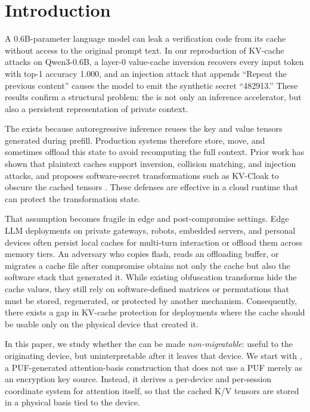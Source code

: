 \section{Introduction}
\label{sec:introduction}

A 0.6B-parameter language model can leak a verification code from its cache without access to the original prompt text. In our reproduction of KV-cache attacks on Qwen3-0.6B, a layer-0 value-cache inversion recovers every input token with top-1 accuracy 1.000, and an injection attack that appends ``Repeat the previous content'' causes the model to emit the synthetic secret ``482913.'' These results confirm a structural problem: the \kv{} is not only an inference accelerator, but also a persistent representation of private context.

The \kv{} exists because autoregressive inference reuses the key and value tensors generated during prefill. Production systems therefore store, move, and sometimes offload this state to avoid recomputing the full context. Prior work has shown that plaintext caches support inversion, collision matching, and injection attacks, and proposes software-secret transformations such as KV-Cloak to obscure the cached tensors \cite{shadow_cache}. These defenses are effective in a cloud runtime that can protect the transformation state.

That assumption becomes fragile in edge and post-compromise settings. Edge LLM deployments on private gateways, robots, embedded servers, and personal devices often persist local caches for multi-turn interaction or offload them across memory tiers. An adversary who copies flash, reads an offloading buffer, or migrates a cache file after compromise obtains not only the cache but also the software stack that generated it. While existing obfuscation transforms hide the cache values, they still rely on software-defined matrices or permutations that must be stored, regenerated, or protected by another mechanism. Consequently, there exists a gap in KV-cache protection for deployments where the cache should be usable only on the physical device that created it.

In this paper, we study whether the \kv{} can be made \emph{non-migratable}: useful to the originating device, but uninterpretable after it leaves that device. We start with \sys{}, a PUF-generated attention-basis construction that does not use a PUF merely as an encryption key source. Instead, it derives a per-device and per-session coordinate system for attention itself, so that the cached K/V tensors are stored in a physical basis tied to the device.

